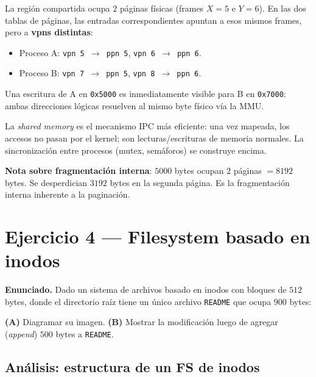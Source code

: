\documentclass[11pt,a4paper]{article}
\begin{document}
\begin{respuesta}
La región compartida ocupa $2$ páginas físicas (frames $X = 5$ e
$Y = 6$). En las dos tablas de páginas, las entradas correspondientes
apuntan a esos mismos frames, pero a \textbf{vpns distintas}:

\begin{itemize}[leftmargin=*,nosep]
    \item Proceso A: \texttt{vpn 5 $\to$ ppn 5}, \texttt{vpn 6 $\to$ ppn 6}.
    \item Proceso B: \texttt{vpn 7 $\to$ ppn 5}, \texttt{vpn 8 $\to$ ppn 6}.
\end{itemize}

Una escritura de A en \texttt{0x5000} es inmediatamente visible para
B en \texttt{0x7000}: ambas direcciones lógicas resuelven al mismo
byte físico vía la MMU.
\end{respuesta}

\begin{idea}
La \emph{shared memory} es el mecanismo IPC más eficiente: una vez
mapeada, los accesos no pasan por el kernel; son lecturas/escrituras
de memoria normales. La sincronización entre procesos (mutex,
semáforos) se construye encima.

\textbf{Nota sobre fragmentación interna}: $5000$ bytes ocupan $2$
páginas $= 8192$ bytes. Se desperdician $3192$ bytes en la segunda
página. Es la fragmentación interna inherente a la paginación.
\end{idea}

\section{Ejercicio 4 --- Filesystem basado en inodos}

\textbf{Enunciado.} Dado un sistema de archivos basado en inodos con
bloques de $512$ bytes, donde el directorio raíz tiene un único
archivo \texttt{README} que ocupa $900$ bytes:

\textbf{(A)} Diagramar su imagen.
\textbf{(B)} Mostrar la modificación luego de agregar (\emph{append})
$500$ bytes a \texttt{README}.

\subsection*{Análisis: estructura de un FS de inodos}
\end{document}
